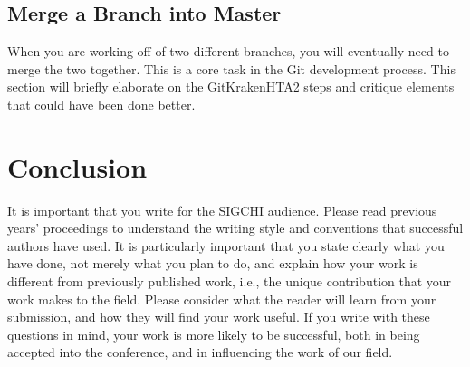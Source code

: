 \documentclass{sigchi}
\begin{document}
\subsection{Merge a Branch into Master}
When you are working off of two different branches, you will eventually need to merge the two together.
This is a core task in the Git development process. This section will briefly elaborate on the GitKrakenHTA2 steps and critique elements that could have been done better.




\section{Conclusion}
It is important that you write for the SIGCHI audience. Please read
previous years' proceedings to understand the writing style and
conventions that successful authors have used. It is particularly
important that you state clearly what you have done, not merely what
you plan to do, and explain how your work is different from previously
published work, i.e., the unique contribution that your work makes to
the field. Please consider what the reader will learn from your
submission, and how they will find your work useful. If you write with
these questions in mind, your work is more likely to be successful,
both in being accepted into the conference, and in influencing the
work of our field.


\balance{}



\end{document}
